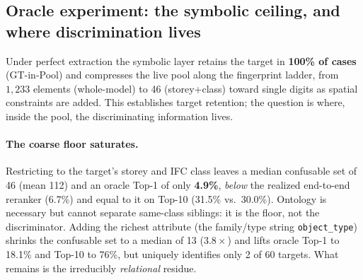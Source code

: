 \subsection{Oracle experiment: the symbolic ceiling, and where discrimination lives}
\label{sec:eval-oracle}

Under perfect extraction the symbolic layer retains the target in \textbf{100\% of cases}
(GT-in-Pool) and compresses the live pool along the fingerprint ladder, from $1{,}233$
elements (whole-model) to 46 (storey+class) toward single digits as spatial constraints are added. This establishes target retention; the question is where,
inside the pool, the discriminating information lives.

\paragraph{The coarse floor saturates.} Restricting to the target's storey and IFC class leaves a
median confusable set of 46 (mean 112) and an oracle Top-1 of only \textbf{4.9\%}, \emph{below} the
realized end-to-end reranker (6.7\%) and equal to it on Top-10 (31.5\% vs.\ 30.0\%). Ontology is
necessary but cannot separate same-class siblings: it is the floor, not the discriminator. Adding the
richest attribute (the family/type string \texttt{object\_type}) shrinks the confusable set to a
median of 13 ($3.8\times$) and lifts oracle Top-1 to 18.1\% and Top-10 to 76\%, but uniquely
identifies only 2 of 60 targets. What remains is the irreducibly \emph{relational} residue.

